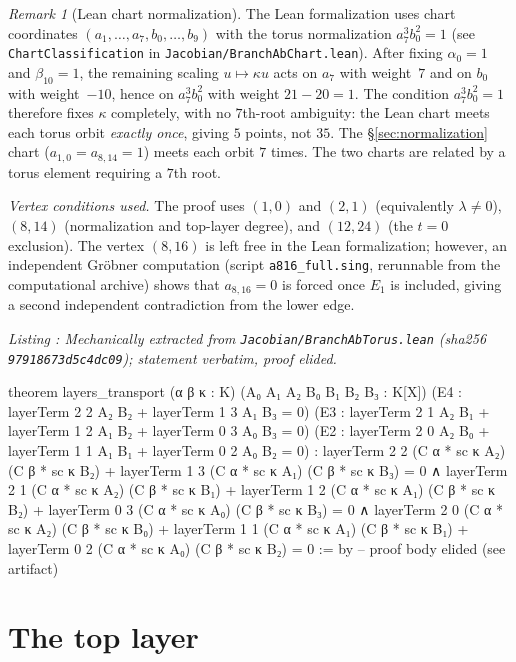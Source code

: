 \documentclass[a4paper,11pt]{article}
\newcounter{leanlisting}
\newenvironment{leanlisting}[2]{%
  \refstepcounter{leanlisting}\label{#2}%
  \begin{center}\textit{\small Listing \theleanlisting: #1}\end{center}%
  \Verbatim[breaklines=true,breakanywhere=true,fontsize=\footnotesize,frame=single,framesep=4pt,rulecolor=\color{gray!50},fillcolor=\color{gray!5}]%
}{%
  \endVerbatim%
}
\theoremstyle{plain}
\theoremstyle{definition}
\theoremstyle{remark}
\newtheorem{remark}[theorem]{Remark}
\begin{document}
\begin{remark}[Lean chart normalization]
The Lean formalization uses chart coordinates $(a_1,\dots,a_7,b_0,\dots,b_9)$ with the torus normalization $a_7^3 b_0^2 = 1$ (see \texttt{ChartClassification} in \texttt{Jacobian/BranchAbChart.lean}). After fixing $\alpha_0 = 1$ and $\beta_{10} = 1$, the remaining scaling $u \mapsto \kappa u$ acts on $a_7$ with weight~$7$ and on $b_0$ with weight~$-10$, hence on $a_7^3 b_0^2$ with weight $21 - 20 = 1$. The condition $a_7^3 b_0^2 = 1$ therefore fixes $\kappa$ completely, with no $7$th-root ambiguity: the Lean chart meets each torus orbit \emph{exactly once}, giving $5$ points, not $35$. The \S\ref{sec:normalization} chart ($a_{1,0} = a_{8,14} = 1$) meets each orbit $7$ times. The two charts are related by a torus element requiring a $7$th root.
\end{remark}

\emph{Vertex conditions used.}\label{sec:lower-edge} The proof uses $(1,0)$ and $(2,1)$ (equivalently $\lambda\neq0$), $(8,14)$ (normalization and top-layer degree), and $(12,24)$ (the $t=0$ exclusion). The vertex $(8,16)$ is left free in the Lean formalization; however, an independent Gr\"obner computation (script \texttt{a816\_full.sing}, rerunnable from the computational archive) shows that $a_{8,16} = 0$ is forced once $E_1$ is included, giving a second independent contradiction from the lower edge.

\begin{leanlisting}{Mechanically extracted from \texttt{Jacobian/BranchAbTorus.lean} (sha256 \texttt{97918673d5c4dc09}); statement verbatim, proof elided.}{lst:torus}
theorem layers_transport (α β κ : K) (A₀ A₁ A₂ B₀ B₁ B₂ B₃ : K[X])
    (E4 : layerTerm 2 2 A₂ B₂ + layerTerm 1 3 A₁ B₃ = 0)
    (E3 : layerTerm 2 1 A₂ B₁ + layerTerm 1 2 A₁ B₂ + layerTerm 0 3 A₀ B₃ = 0)
    (E2 : layerTerm 2 0 A₂ B₀ + layerTerm 1 1 A₁ B₁ + layerTerm 0 2 A₀ B₂ = 0) :
    layerTerm 2 2 (C α * sc κ A₂) (C β * sc κ B₂) + layerTerm 1 3 (C α * sc κ A₁) (C β * sc κ B₃) = 0 ∧
    layerTerm 2 1 (C α * sc κ A₂) (C β * sc κ B₁) + layerTerm 1 2 (C α * sc κ A₁) (C β * sc κ B₂) +
      layerTerm 0 3 (C α * sc κ A₀) (C β * sc κ B₃) = 0 ∧
    layerTerm 2 0 (C α * sc κ A₂) (C β * sc κ B₀) + layerTerm 1 1 (C α * sc κ A₁) (C β * sc κ B₁) +
      layerTerm 0 2 (C α * sc κ A₀) (C β * sc κ B₂) = 0 := by
  -- proof body elided (see artifact)
\end{leanlisting}

\section{The top layer}\label{sec:top}
\end{document}

